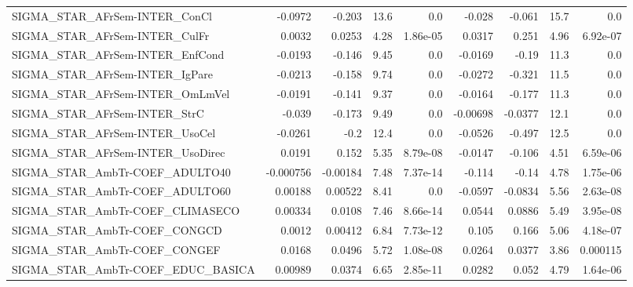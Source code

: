\begin{tabular}{lrrrrrrrr}
SIGMA\_STAR\_AFrSem-INTER\_ConCl          &     -0.0972 &       -0.203 &     13.6 &      0.0 &     -0.028 &      -0.061 &         15.7 &           0.0 \\
SIGMA\_STAR\_AFrSem-INTER\_CulFr          &      0.0032 &       0.0253 &     4.28 & 1.86e-05 &     0.0317 &       0.251 &         4.96 &      6.92e-07 \\
SIGMA\_STAR\_AFrSem-INTER\_EnfCond        &     -0.0193 &       -0.146 &     9.45 &      0.0 &    -0.0169 &       -0.19 &         11.3 &           0.0 \\
SIGMA\_STAR\_AFrSem-INTER\_IgPare         &     -0.0213 &       -0.158 &     9.74 &      0.0 &    -0.0272 &      -0.321 &         11.5 &           0.0 \\
SIGMA\_STAR\_AFrSem-INTER\_OmLmVel        &     -0.0191 &       -0.141 &     9.37 &      0.0 &    -0.0164 &      -0.177 &         11.3 &           0.0 \\
SIGMA\_STAR\_AFrSem-INTER\_StrC           &      -0.039 &       -0.173 &     9.49 &      0.0 &   -0.00698 &     -0.0377 &         12.1 &           0.0 \\
SIGMA\_STAR\_AFrSem-INTER\_UsoCel         &     -0.0261 &         -0.2 &     12.4 &      0.0 &    -0.0526 &      -0.497 &         12.5 &           0.0 \\
SIGMA\_STAR\_AFrSem-INTER\_UsoDirec       &      0.0191 &        0.152 &     5.35 & 8.79e-08 &    -0.0147 &      -0.106 &         4.51 &      6.59e-06 \\
SIGMA\_STAR\_AmbTr-COEF\_ADULTO40         &   -0.000756 &     -0.00184 &     7.48 & 7.37e-14 &     -0.114 &       -0.14 &         4.78 &      1.75e-06 \\
SIGMA\_STAR\_AmbTr-COEF\_ADULTO60         &     0.00188 &      0.00522 &     8.41 &      0.0 &    -0.0597 &     -0.0834 &         5.56 &      2.63e-08 \\
SIGMA\_STAR\_AmbTr-COEF\_CLIMASECO        &     0.00334 &       0.0108 &     7.46 & 8.66e-14 &     0.0544 &      0.0886 &         5.49 &      3.95e-08 \\
SIGMA\_STAR\_AmbTr-COEF\_CONGCD           &      0.0012 &      0.00412 &     6.84 & 7.73e-12 &      0.105 &       0.166 &         5.06 &      4.18e-07 \\
SIGMA\_STAR\_AmbTr-COEF\_CONGEF           &      0.0168 &       0.0496 &     5.72 & 1.08e-08 &     0.0264 &      0.0377 &         3.86 &      0.000115 \\
SIGMA\_STAR\_AmbTr-COEF\_EDUC\_BASICA      &     0.00989 &       0.0374 &     6.65 & 2.85e-11 &     0.0282 &       0.052 &         4.79 &      1.64e-06 \\

\end{tabular}
